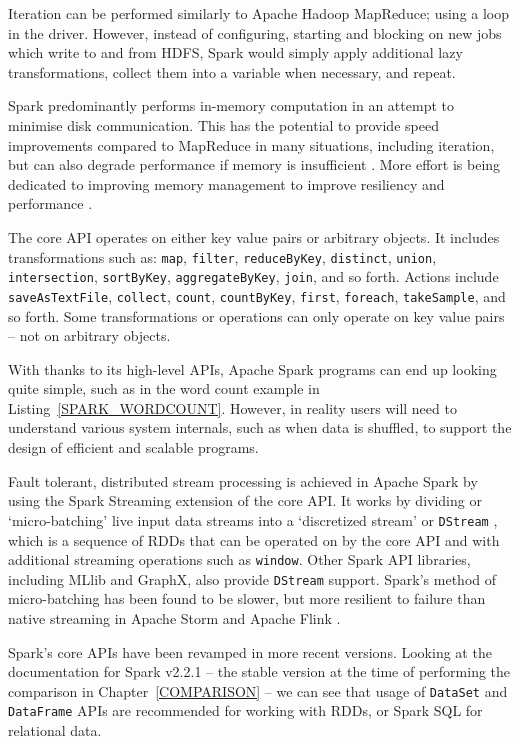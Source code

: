   Iteration can be performed similarly to Apache Hadoop MapReduce; using a loop in the driver. However, instead of configuring, starting and blocking on new jobs which write to and from HDFS, Spark would simply apply additional lazy transformations, collect them into a variable when necessary, and repeat.
  
  Spark predominantly performs in-memory computation in an attempt to minimise disk communication. This has the potential to provide speed improvements compared to MapReduce in many situations, including iteration, but can also degrade performance if memory is insufficient \cite{GU:MEM_OR_TIME:2013}. More effort is being dedicated to improving memory management to improve resiliency and performance \cite{MARCU:SPARK_VS_FLINK:2016}.
  
  The core API operates on either key value pairs or arbitrary objects. It includes transformations such as: \texttt{map}, \texttt{filter}, \texttt{reduceByKey}, \texttt{distinct}, \texttt{union}, \texttt{intersection}, \texttt{sortByKey}, \texttt{aggregateByKey}, \texttt{join}, and so forth. Actions include \texttt{saveAsTextFile}, \texttt{collect}, \texttt{count}, \texttt{countByKey}, \texttt{first}, \texttt{foreach}, \texttt{takeSample}, and so forth. Some transformations or operations can only operate on key value pairs -- not on arbitrary objects.
  
  With thanks to its high-level APIs, Apache Spark programs can end up looking quite simple, such as in the word count example in Listing~\ref{SPARK_WORDCOUNT}. However, in reality users will need to understand various system internals, such as when data is shuffled, to support the design of efficient and scalable programs.
  
  Fault tolerant, distributed stream processing is achieved in Apache Spark by using the Spark Streaming extension of the core API. It works by dividing or `micro-batching' live input data streams into a `discretized stream' or \texttt{DStream} \cite{ZAHARIA:DSTREAM:2012}, which is a sequence of RDDs that can be operated on by the core API and with additional streaming operations such as \texttt{window}. Other Spark API libraries, including MLlib and GraphX, also provide \texttt{DStream} support. Spark's method of micro-batching has been found to be slower, but more resilient to failure than native streaming in Apache Storm and Apache Flink \cite{LOPEZ:STREAM_COMPARISON:2016}.

  Spark's core APIs have been revamped in more recent versions. Looking at the documentation for Spark v2.2.1 -- the stable version at the time of performing the comparison in Chapter~\ref{COMPARISON} -- we can see that usage of \texttt{DataSet} and \texttt{DataFrame} APIs are recommended for working with RDDs, or Spark SQL for relational data.
  


